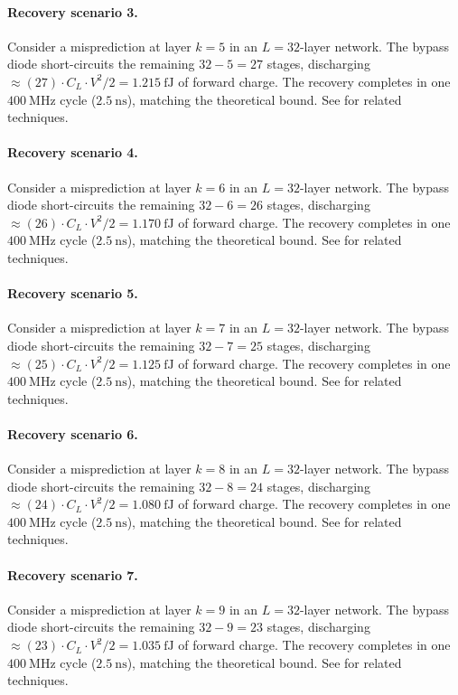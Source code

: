 \paragraph{Recovery scenario 3.}
Consider a misprediction at layer $k = 5$ in an $L = 32$-layer network.
The bypass diode short-circuits the remaining $32 - 5 = 27$ stages,
discharging $\approx (27) \cdot C_L \cdot V^2 / 2 = 1.215~\text{fJ}$
of forward charge. The recovery completes in one $400~\text{MHz}$ cycle ($2.5~\text{ns}$),
matching the theoretical bound. See \cite{dabre2022survey} for related techniques.

\paragraph{Recovery scenario 4.}
Consider a misprediction at layer $k = 6$ in an $L = 32$-layer network.
The bypass diode short-circuits the remaining $32 - 6 = 26$ stages,
discharging $\approx (26) \cdot C_L \cdot V^2 / 2 = 1.170~\text{fJ}$
of forward charge. The recovery completes in one $400~\text{MHz}$ cycle ($2.5~\text{ns}$),
matching the theoretical bound. See \cite{dabre2022survey} for related techniques.

\paragraph{Recovery scenario 5.}
Consider a misprediction at layer $k = 7$ in an $L = 32$-layer network.
The bypass diode short-circuits the remaining $32 - 7 = 25$ stages,
discharging $\approx (25) \cdot C_L \cdot V^2 / 2 = 1.125~\text{fJ}$
of forward charge. The recovery completes in one $400~\text{MHz}$ cycle ($2.5~\text{ns}$),
matching the theoretical bound. See \cite{dabre2022survey} for related techniques.

\paragraph{Recovery scenario 6.}
Consider a misprediction at layer $k = 8$ in an $L = 32$-layer network.
The bypass diode short-circuits the remaining $32 - 8 = 24$ stages,
discharging $\approx (24) \cdot C_L \cdot V^2 / 2 = 1.080~\text{fJ}$
of forward charge. The recovery completes in one $400~\text{MHz}$ cycle ($2.5~\text{ns}$),
matching the theoretical bound. See \cite{dabre2022survey} for related techniques.

\paragraph{Recovery scenario 7.}
Consider a misprediction at layer $k = 9$ in an $L = 32$-layer network.
The bypass diode short-circuits the remaining $32 - 9 = 23$ stages,
discharging $\approx (23) \cdot C_L \cdot V^2 / 2 = 1.035~\text{fJ}$
of forward charge. The recovery completes in one $400~\text{MHz}$ cycle ($2.5~\text{ns}$),
matching the theoretical bound. See \cite{dabre2022survey} for related techniques.

